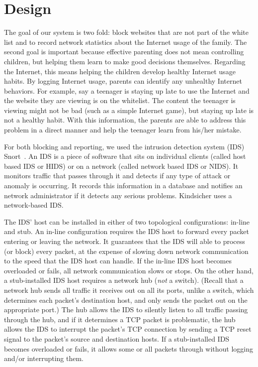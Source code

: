 
\section{Design}

The goal of our system is two fold: block websites that are not part of the
white list and to record network statistics about the Internet usage of the
family.
%
The second goal is important because effective parenting does not mean
controlling children, but helping them learn to make good decisions
themselves.\cite{severe}
%
Regarding the Internet, this means helping the children develop healthy
Internet usage habits.
%
By logging Internet usage, parents can identify any unhealthy Internet
behaviors.
%
For example, say a teenager is staying up late to use the Internet and the
website they are viewing is on the whitelist.
%
The content the teenager is viewing might not be bad (such as a simple
Internet game), but staying up late is not a healthy habit.
%
With this information, the parents are able to address this problem in a
direct manner and help the teenager learn from his/her mistake.

For both blocking and reporting, we used the intrusion detection system (IDS)
Snort~\cite{snort}. An IDS is a piece of software that sits on individual
clients (called host based IDS or HIDS) or on a network (called network based
IDS or NIDS). It monitors traffic that passes through it and detects if any
type of attack or anomaly is occurring. It records this information in a
database and notifies an network administrator if it detects any serious
problems.  Kindsicher uses a network-based IDS.

The IDS' host can be installed in either of two topological configurations:
in-line and stub.
%
An in-line configuration requires the IDS host to forward every packet
entering or leaving the network.
%
It guarantees that the IDS will able to process (or block) every packet, at
the expense of slowing down network communication to the speed that the IDS
host can handle.
%
If the in-line IDS host becomes overloaded or fails, all network communication
slows or stops.
%
On the other hand, a stub-installed IDS host requires a network hub (\emph{not} a
switch).
%
(Recall that a network hub sends all traffic it receives out on all its ports,
unlike a switch, which determines each packet's destination host, and only
sends the packet out on the appropriate port.)
%
The hub allows the IDS to silently listen to all traffic passing through the
hub, and if it determines a TCP packet is problematic, the hub allows the IDS
to interrupt the packet's TCP connection by sending a TCP reset signal to the
packet's source and destination hosts.
%
If a stub-installed IDS becomes overloaded or fails, it allows some or all
packets through without logging and/or interrupting them.

